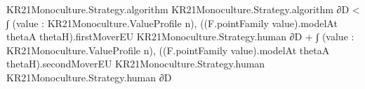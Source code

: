 \documentclass[10pt]{article}
\begin{document}
\begin{ReviewVerbatim}
                                                              KR21Monoculture.Strategy.algorithm
                                                              KR21Monoculture.Strategy.algorithm ∂D <
                                                        ∫ (value : KR21Monoculture.ValueProfile n),
                                                            ((F.pointFamily value).modelAt thetaA thetaH).firstMoverEU
                                                              KR21Monoculture.Strategy.human ∂D +
                                                          ∫ (value : KR21Monoculture.ValueProfile n),
                                                            ((F.pointFamily value).modelAt thetaA thetaH).secondMoverEU
                                                              KR21Monoculture.Strategy.human
                                                              KR21Monoculture.Strategy.human ∂D
\end{ReviewVerbatim}
\end{document}
